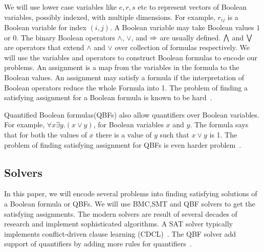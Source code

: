 We will use lower case variables like $e,r,s$ etc to represent vectors of
Boolean variables, possibly indexed, with multiple dimensions.
%
For example, $r_{ij}$ is a Boolean variable for index $(i,j)$.
%
%
A Boolean variable may take Boolean values $1$ or $0$.
%
The binary Boolean operators $\land$, $\lor$, and $\Rightarrow$ are usually defined.
%
$\bigwedge$ and $\bigvee$ are operators that extend $\land$ and $\lor$ over
collection of formulas respectively.
%
We will use the variables and operators to construct Boolean formulas to
encode our problems.
%
An assignment is a map from the variables in the formula to the Boolean values.
%
An assignment may satisfy a formula if the interpretation of Boolean operators
reduce the whole Formula into 1.
%
The problem of finding a satisfying assignment for a Boolean formula is
known to be hard~\cite{sat-hard}.
%

Quantified Boolean formulas(QBFs) also allow quantifiers over Boolean variables.
%
For example, $\forall x \exists y. (x \lor y)$, for Boolean variables $x$ and $y$.
%
The formula says that for both the values of $x$ there is a value of $y$
such that $x \lor y$ is 1.
%
The problem of finding satisfying assignment for QBFs is even harder problem~\cite{qbf-hard}.
%


\subsection{Solvers}
In this paper, we will encode several problems into finding satisfying
solutions of a Boolean formula or QBFs.
%
We will use BMC,SMT and QBF solvers to get the satisfying assignments.
%
The modern solvers are result of several decades of research
and implement sophisticated algorithms.
%
A SAT solver typically implements conflict-driven clause learning (CDCL)~\cite{cdcl}.
%
The QBF solver add support of quantifiers by adding more rules for
quantifiers~\cite{qbf}.

%
%

